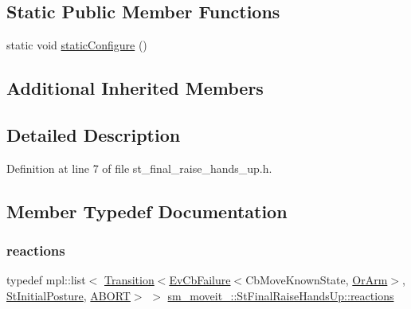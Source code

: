 \subsection*{Static Public Member Functions}
\begin{DoxyCompactItemize}
\item 
static void \hyperlink{structsm__moveit__4_1_1StFinalRaiseHandsUp_aabce6ade1a08aa3de0a2cfc1f33810bb}{static\+Configure} ()
\end{DoxyCompactItemize}
\subsection*{Additional Inherited Members}


\subsection{Detailed Description}


Definition at line 7 of file st\+\_\+final\+\_\+raise\+\_\+hands\+\_\+up.\+h.



\subsection{Member Typedef Documentation}
\mbox{\label{structsm__moveit__4_1_1StFinalRaiseHandsUp_a2d83997f06b11791828d8edb27724f2a}} 
\subsubsection{\texorpdfstring{reactions}{reactions}}
{\footnotesize\ttfamily typedef mpl\+::list$<$ \hyperlink{classsmacc_1_1Transition}{Transition}$<$\hyperlink{structsmacc_1_1EvCbFailure}{Ev\+Cb\+Failure}$<$Cb\+Move\+Known\+State, \hyperlink{classsm__moveit__4_1_1OrArm}{Or\+Arm}$>$, \hyperlink{structsm__moveit__4_1_1StInitialPosture}{St\+Initial\+Posture}, \hyperlink{structsmacc_1_1default__transition__tags_1_1ABORT}{A\+B\+O\+RT}$>$ $>$ \hyperlink{structsm__moveit__4_1_1StFinalRaiseHandsUp_a2d83997f06b11791828d8edb27724f2a}{sm\+\_\+moveit\+\_\+::\+St\+Final\+Raise\+Hands\+Up\+::reactions}}



